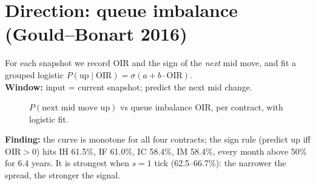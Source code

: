 \documentclass[11pt]{article}
\begin{document}
\section{Direction: queue imbalance (Gould--Bonart 2016)}
For each snapshot we record OIR and the sign of the \emph{next} mid move, and fit a grouped
logistic $P(\text{up}\mid \text{OIR}) = \sigma(a+b\cdot\text{OIR})$.
\\ \textbf{Window:} input = current snapshot; predict the next mid change.
\begin{figure}[H]\centering
  \caption{$P(\text{next mid move up})$ vs queue imbalance OIR, per contract, with logistic fit.}
  \label{fig:qi}
\end{figure}
\textbf{Finding:} the curve is monotone for all four contracts; the sign rule
(predict up iff OIR$>0$) hits IH 61.5\%, IF 61.0\%, IC 58.4\%, IM 58.4\%, every month above
50\% for 6.4 years. It is strongest when $s=1$ tick (62.5--66.7\%): the narrower the spread,
the stronger the signal.
\end{document}
